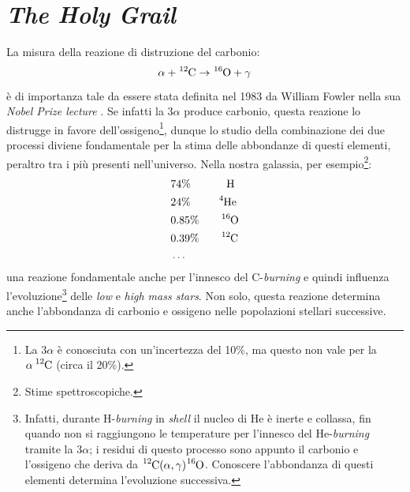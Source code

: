 \newpage
\section{\textit{The Holy Grail}}
La misura della reazione di distruzione del carbonio:
$$\alpha +\ce{^{12}C}\to\ce{^{16}O}+\gamma$$
è di importanza tale da essere stata definita nel 1983 da William Fowler nella sua \textit{Nobel Prize lecture} \textit{}. Se infatti la $3\alpha$ produce carbonio, questa reazione lo distrugge in favore dell'ossigeno\footnote{La $3\alpha$ è conosciuta con un'incertezza del 10\%, ma questo non vale per la $\alpha\, \ce{^{12}C}$ (circa il 20\%).}, dunque lo studio della combinazione dei due processi diviene fondamentale per la stima delle abbondanze di questi elementi, peraltro tra i più presenti nell'universo. Nella nostra galassia, per esempio\footnote{Stime spettroscopiche.}:
\begin{align*}
	&74\%\qquad\;\quad\ce{H} \\
	&24\%\qquad\;\;\ce{^{4}He} \\
	&0.85\%\qquad\ce{^{16}O} \\
	&0.39\%\qquad\ce{^{12}C} \\
	&\dots
\end{align*}
 una reazione fondamentale anche per l'innesco del C-\textit{burning} e quindi influenza l'evoluzione\footnote{Infatti, durante H-\textit{burning} in \textit{shell} il nucleo di He è inerte e collassa, fin quando non si raggiungono le temperature per l'innesco del He-\textit{burning} tramite la $3\alpha$; i residui di questo processo sono appunto il carbonio e l'ossigeno che deriva da $\ce{^{12}C}(\alpha,\gamma)\ce{^{16}O}$. Conoscere l'abbondanza di questi elementi determina l'evoluzione successiva.} delle \textit{low} e \textit{high mass stars}. Non solo, questa reazione determina anche l'abbondanza di carbonio e ossigeno nelle popolazioni stellari successive.

